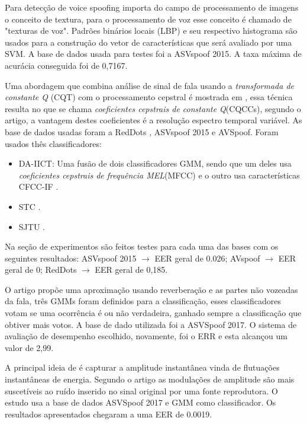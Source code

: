 \documentclass[a4paper,12pt,openright,oneside]{book}
\newenvironment{myenv}[1]
  {\begin{spacing}{#1}}
  {\end{spacing}}
\begin{document}
\begin{myenv}{1.5}
			\par Para detecção de voice spoofing  \cite{ISI:000473343500086} importa do campo de processamento de imagens o conceito de textura, para o processamento de voz esse conceito é chamado de "texturas de voz". Padrões binários locais (LBP) e seu respectivo histograma são usados para a construção do vetor de características que será avaliado por uma SVM. A base de dados usada para testes foi a ASVspoof 2015. A taxa máxima de acurácia conseguida foi de 0,7167.
			
			\par Uma abordagem que combina análise de sinal de fala usando a \textit{transformada de constante Q} (CQT) com o processamento cepstral é mostrada em \cite{TODISCO2017516}, essa técnica resulta no que se chama \textit{coeficientes cepstrais de constante Q}(CQCCs), segundo o artigo, a vantagem destes coeficientes é a resolução espectro temporal variável. As base de dados usadas foram a RedDots \cite{redDots}, ASVspoof 2015 e AVSpoof. Foram usados thês classificadores:
			\begin{itemize}
				\item DA-IICT: Uma fusão de dois classificadores GMM, sendo que um deles usa \textit{coeficientes cepstrais de frequência MEL}(MFCC) e o outro usa características CFCC-IF \cite{Patel2015}.
				\item STC \cite{7472724}.
				\item SJTU \cite{korshunov2016overview}.
			\end{itemize}			
			Na seção de experimentos são feitos testes para cada uma das bases com os seguintes resultados: ASVspoof 2015 $\rightarrow$ EER geral de 0.026; AVspoof $\rightarrow$ EER geral de 0; RedDots $\rightarrow$ EER geral de 0,185.

			\par O artigo \cite{ISI:000490497200068} propõe uma aproximação usando reverberação e as partes não vozeadas da fala, três GMMs foram definidos para a classificação, esses classificadores votam se uma ocorrência é ou não verdadeira, ganhado sempre a classificação que obtiver mais votos. A base de dado utilizada foi a ASVSpoof 2017. O sistema de avaliação de desempenho escolhido, novamente, foi o ERR e esta alcançou um valor de 2,99.
			
			\par A principal ideia de \cite{ISI:000465363900136} é capturar a amplitude instantânea vinda de flutuações instantâneas de energia. Segundo o artigo as modulações de amplitude são mais suscetíveis ao ruído inserido no sinal original por uma fonte reprodutora. O estudo usa a base de dados ASVSpoof 2017 e GMM como classificador. Os resultados apresentados chegaram a uma EER de 0.0019.


\end{myenv}
\end{document}
